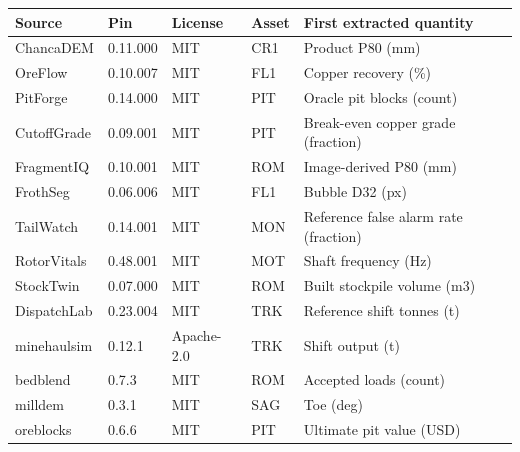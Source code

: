 \begin{tabular}{p{}p{}p{}p{}p{}}
\toprule Source & Pin & License & Asset & First extracted quantity\\\midrule
ChancaDEM & 0.11.000 & MIT & CR1 & Product P80 (mm)\\
OreFlow & 0.10.007 & MIT & FL1 & Copper recovery (\%)\\
PitForge & 0.14.000 & MIT & PIT & Oracle pit blocks (count)\\
CutoffGrade & 0.09.001 & MIT & PIT & Break-even copper grade (fraction)\\
FragmentIQ & 0.10.001 & MIT & ROM & Image-derived P80 (mm)\\
FrothSeg & 0.06.006 & MIT & FL1 & Bubble D32 (px)\\
TailWatch & 0.14.001 & MIT & MON & Reference false alarm rate (fraction)\\
RotorVitals & 0.48.001 & MIT & MOT & Shaft frequency (Hz)\\
StockTwin & 0.07.000 & MIT & ROM & Built stockpile volume (m3)\\
DispatchLab & 0.23.004 & MIT & TRK & Reference shift tonnes (t)\\
minehaulsim & 0.12.1 & Apache-2.0 & TRK & Shift output (t)\\
bedblend & 0.7.3 & MIT & ROM & Accepted loads (count)\\
milldem & 0.3.1 & MIT & SAG & Toe (deg)\\
oreblocks & 0.6.6 & MIT & PIT & Ultimate pit value (USD)\\
\bottomrule\end{tabular}
